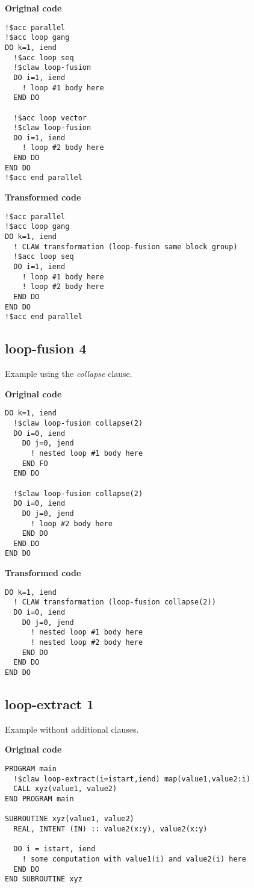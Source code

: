 \documentclass{article}
\begin{document}
\textbf{Original code}
\begin{lstlisting}
!$acc parallel
!$acc loop gang
DO k=1, iend
  !$acc loop seq
  !$claw loop-fusion
  DO i=1, iend
    ! loop #1 body here
  END DO

  !$acc loop vector
  !$claw loop-fusion
  DO i=1, iend
    ! loop #2 body here
  END DO
END DO
!$acc end parallel
\end{lstlisting}

\textbf{Transformed code}
\begin{lstlisting}
!$acc parallel
!$acc loop gang
DO k=1, iend
  ! CLAW transformation (loop-fusion same block group)
  !$acc loop seq
  DO i=1, iend
    ! loop #1 body here
    ! loop #2 body here
  END DO
END DO
!$acc end parallel
\end{lstlisting}

\subsection{loop-fusion 4}
\label{loop-fusion4}
Example using the \textit{collapse} clause. 

\textbf{Original code}
\begin{lstlisting}
DO k=1, iend
  !$claw loop-fusion collapse(2)
  DO i=0, iend
    DO j=0, jend
      ! nested loop #1 body here
    END FO
  END DO

  !$claw loop-fusion collapse(2)
  DO i=0, iend
    DO j=0, jend
      ! loop #2 body here
    END DO
  END DO
END DO
\end{lstlisting}


\textbf{Transformed code}
\begin{lstlisting}
DO k=1, iend
  ! CLAW transformation (loop-fusion collapse(2))
  DO i=0, iend
    DO j=0, jend
      ! nested loop #1 body here
      ! nested loop #2 body here
    END DO
  END DO
END DO
\end{lstlisting}



\subsection{loop-extract 1}
\label{loop-extract1}
Example without additional clauses. 

\textbf{Original code}
\begin{lstlisting}
PROGRAM main
  !$claw loop-extract(i=istart,iend) map(value1,value2:i)
  CALL xyz(value1, value2)
END PROGRAM main

SUBROUTINE xyz(value1, value2)
  REAL, INTENT (IN) :: value2(x:y), value2(x:y)

  DO i = istart, iend
    ! some computation with value1(i) and value2(i) here
  END DO
END SUBROUTINE xyz
\end{lstlisting}
\end{document}
